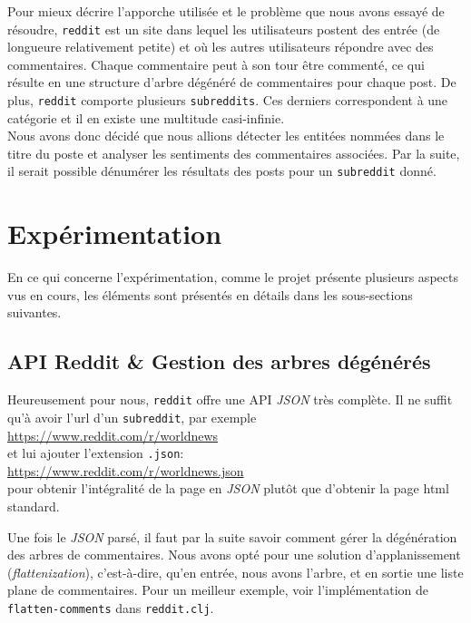\documentclass[12pt]{article}
\begin{document}
Pour mieux décrire l'apporche utilisée et le problème que nous avons essayé de résoudre, \verb;reddit; est un site dans lequel les utilisateurs postent des entrée (de longueure relativement petite) et où les autres utilisateurs répondre avec des commentaires. Chaque commentaire peut à son tour être commenté, ce qui résulte en une structure d'arbre dégénéré de commentaires pour chaque post. De plus, \verb;reddit; comporte plusieurs \verb;subreddits;. Ces derniers correspondent à une catégorie et il en existe une multitude casi-infinie.\\

Nous avons donc décidé que nous allions détecter les entitées nommées dans le titre du poste et analyser les sentiments des commentaires associées. Par la suite, il serait possible dénumérer les résultats des posts pour un \verb;subreddit; donné.

\section{Expérimentation}

En ce qui concerne l'expérimentation, comme le projet présente plusieurs aspects vus en cours, les éléments sont présentés en détails dans les sous-sections suivantes.

\subsection{API Reddit \& Gestion des arbres dégénérés}

Heureusement pour nous, \verb;reddit; offre une API \textit{JSON} très complète. Il ne suffit qu'à avoir l'url d'un \verb;subreddit;, par exemple\\

\url{https://www.reddit.com/r/worldnews}\\

et lui ajouter l'extension \verb;.json;:\\

\url{https://www.reddit.com/r/worldnews.json}\\

pour obtenir l'intégralité de la page en \textit{JSON} plutôt que d'obtenir la page html standard.

Une fois le \textit{JSON} parsé, il faut par la suite savoir comment gérer la dégénération des arbres de commentaires. Nous avons opté pour une solution d'applanissement (\textit{flattenization}), c'est-à-dire, qu'en entrée, nous avons l'arbre, et en sortie une liste plane de commentaires. Pour un meilleur exemple, voir l'implémentation de \verb;flatten-comments; dans \verb;reddit.clj;.
\end{document}

